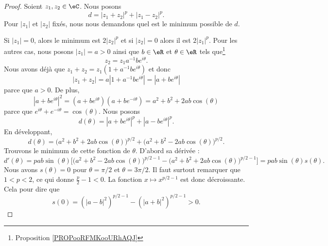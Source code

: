 \begin{proof}
    Soient \( z_1,z_2\in \eC\). Nous posons
    \begin{equation}        \label{EQooJKYZooFzbETG}
        d=| z_1+z_2 |^p+| z_1-z_2 |^p.
    \end{equation}
    Pour \( | z_1 |\) et \( | z_2 |\) fixés, nous nous demandons quel est le minimum possible de \( d\).

    Si \( | z_1 |=0\), alors le minimum est \( 2| z_2 |^p\) et si \( | z_2 |=0\) alors il est \( 2| z_1 |^p\). Pour les autres cas, nous posons $| z_1 |=a>0$ ainsi que \( b\in \eR\) et \( \theta\in \eR\) tels que\footnote{Proposition \ref{PROPooRFMKooURhAQJ}}
    \begin{equation}
        z_2=z_1a^{-1}b e^{i\theta}.
    \end{equation}
    Nous avons déjà que \( z_1+z_2=z_1(1+a^{-1}b e^{i\theta})\) et donc
    \begin{equation}
        | z_1+z_2 |=a| 1+a^{-1}b e^{i\theta} |=| a+b e^{i\theta} |
    \end{equation}
    parce que \( a>0\). De plus,
    \begin{equation}
        | a+b e^{i\theta} |^2= (a+b e^{i\theta})(a+b e^{-i\theta})=a^2+b^2+2ab\cos(\theta)
    \end{equation}
    parce que \(  e^{i\theta}+ e^{-i\theta}=\cos(\theta)\). Nous posons
    \begin{equation}
        d(\theta)=| a+b e^{i\theta} |^p+| a-b e^{i\theta} |^p.
    \end{equation}
    En développant,
    \begin{equation}
        d(\theta)=\big(a^2+b^2+2ab\cos(\theta)\big)^{p/2}+\big(a^2+b^2-2ab\cos(\theta)\big)^{p/2}.
    \end{equation}
    Trouvons le minimum de cette fonction de \( \theta\). D'abord sa dérivée :
    \begin{equation}
        d'(\theta)=pab\sin(\theta)\big[ \big( a^2+b^2-2ab\cos(\theta) \big)^{p/2-1}-\big( a^2+b^2+2ab\cos(\theta) \big)^{p/2-1}  \big]=pab\sin(\theta)s(\theta).
    \end{equation}
    Nous avons \( s(\theta)=0\) pour \( \theta=\pi/2\) et \( \theta=3\pi/2\). Il faut surtout remarquer que \( 1<p<2\), ce qui donne \( \frac{ p }{2}-1<0\). La fonction \( x\mapsto x^{p/2-1}\) est donc décroissante. Cela pour dire que
    \begin{equation}
        s(0)=\left( | a-b |^2 \right)^{p/2-1}-\left( | a+b |^2 \right)^{p/2-1}>0.
    \end{equation}

\end{proof}
